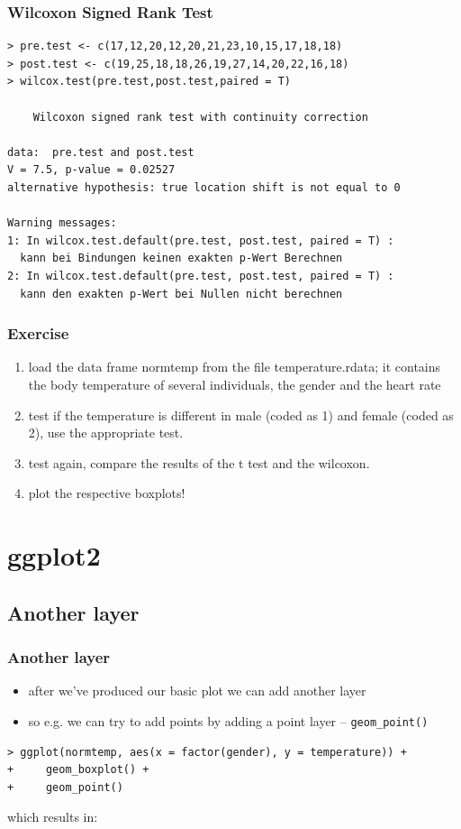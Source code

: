\documentclass[xcolor={table}]{beamer}
\begin{document}
\begin{frame}[fragile]\frametitle{Wilcoxon Signed Rank Test}\footnotesize
\begin{verbatim}
> pre.test <- c(17,12,20,12,20,21,23,10,15,17,18,18)
> post.test <- c(19,25,18,18,26,19,27,14,20,22,16,18)
> wilcox.test(pre.test,post.test,paired = T)

	Wilcoxon signed rank test with continuity correction

data:  pre.test and post.test
V = 7.5, p-value = 0.02527
alternative hypothesis: true location shift is not equal to 0

Warning messages:
1: In wilcox.test.default(pre.test, post.test, paired = T) :
  kann bei Bindungen keinen exakten p-Wert Berechnen
2: In wilcox.test.default(pre.test, post.test, paired = T) :
  kann den exakten p-Wert bei Nullen nicht berechnen
\end{verbatim}
\end{frame}



\begin{frame}\frametitle{Exercise}
  \begin{enumerate}
  \item load the data frame normtemp from the file temperature.rdata; it contains the body temperature of several individuals, the gender and the heart rate
  \item test if the temperature is different in male (coded as 1) and female (coded as 2), use the appropriate test.
  \item test again, compare the results of the t test and the wilcoxon.
  \item plot the respective boxplots!
  \end{enumerate}
\end{frame}

\section{ggplot2}
\subsection{Another layer}
\begin{frame}[fragile]\frametitle{Another layer}
  \begin{itemize}
  \item after we've produced our basic plot we can add another layer
  \item so e.g. we can try to add points by adding a point layer -- \texttt{geom\_point()}
  \end{itemize}\small
\begin{verbatim}
> ggplot(normtemp, aes(x = factor(gender), y = temperature)) +
+     geom_boxplot() +
+     geom_point()  
\end{verbatim}
which results in:
\end{frame}
\end{document}
